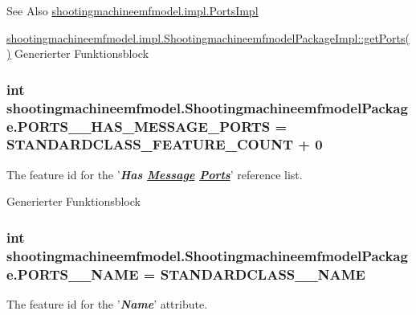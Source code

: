 \begin{DoxySeeAlso}{See Also}
\hyperlink{classshootingmachineemfmodel_1_1impl_1_1_ports_impl}{shootingmachineemfmodel.\-impl.\-Ports\-Impl} 

\hyperlink{classshootingmachineemfmodel_1_1impl_1_1_shootingmachineemfmodel_package_impl_ab434e3a5bfcdf490bed77881dae0841e}{shootingmachineemfmodel.\-impl.\-Shootingmachineemfmodel\-Package\-Impl\-::get\-Ports()} Generierter Funktionsblock 
\end{DoxySeeAlso}
\hypertarget{interfaceshootingmachineemfmodel_1_1_shootingmachineemfmodel_package_abfa26d954e44f83dadd22a364a5ede44}{
\subsubsection[{P\-O\-R\-T\-S\-\_\-\-\_\-\-H\-A\-S\-\_\-\-M\-E\-S\-S\-A\-G\-E\-\_\-\-P\-O\-R\-T\-S}]{\setlength{\rightskip}{0pt plus 5cm}int shootingmachineemfmodel.\-Shootingmachineemfmodel\-Package.\-P\-O\-R\-T\-S\-\_\-\-\_\-\-H\-A\-S\-\_\-\-M\-E\-S\-S\-A\-G\-E\-\_\-\-P\-O\-R\-T\-S = {\bf S\-T\-A\-N\-D\-A\-R\-D\-C\-L\-A\-S\-S\-\_\-\-F\-E\-A\-T\-U\-R\-E\-\_\-\-C\-O\-U\-N\-T} + 0}}\label{interfaceshootingmachineemfmodel_1_1_shootingmachineemfmodel_package_abfa26d954e44f83dadd22a364a5ede44}
The feature id for the '{\itshape {\bfseries Has \hyperlink{interfaceshootingmachineemfmodel_1_1_message}{Message} \hyperlink{interfaceshootingmachineemfmodel_1_1_ports}{Ports}}}' reference list.

Generierter Funktionsblock  \hypertarget{interfaceshootingmachineemfmodel_1_1_shootingmachineemfmodel_package_a19c316778a7ed9961757b257c512945a}{
\subsubsection[{P\-O\-R\-T\-S\-\_\-\-\_\-\-N\-A\-M\-E}]{\setlength{\rightskip}{0pt plus 5cm}int shootingmachineemfmodel.\-Shootingmachineemfmodel\-Package.\-P\-O\-R\-T\-S\-\_\-\-\_\-\-N\-A\-M\-E = {\bf S\-T\-A\-N\-D\-A\-R\-D\-C\-L\-A\-S\-S\-\_\-\-\_\-\-N\-A\-M\-E}}}\label{interfaceshootingmachineemfmodel_1_1_shootingmachineemfmodel_package_a19c316778a7ed9961757b257c512945a}
The feature id for the '{\itshape {\bfseries Name}}' attribute.

